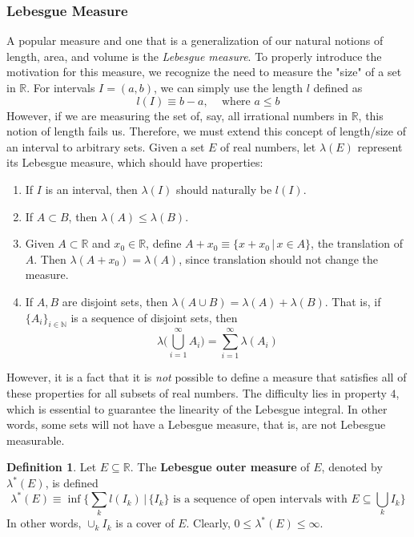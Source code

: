 \documentclass{article}
\theoremstyle{remark}
\theoremstyle{definition}
\newtheorem{definition}{Definition}[section]
\begin{document}
\subsubsection{Lebesgue Measure}
A popular measure and one that is a generalization of our natural notions of length, area, and volume is the \textit{Lebesgue measure}. To properly introduce the motivation for this measure, we recognize the need to measure the "size" of a set in $\mathbb{R}$. For intervals $I = (a, b)$, we can simply use the length $l$ defined as 
\[l(I) \equiv b - a, \;\;\; \text{ where } a \leq b\]
However, if we are measuring the set of, say, all irrational numbers in $\mathbb{R}$, this notion of length fails us. Therefore, we must extend this concept of length/size of an interval to arbitrary sets. Given a set $E$ of real numbers, let $\lambda(E)$ represent its Lebesgue measure, which should have properties: 
\begin{enumerate}
    \item If $I$ is an interval, then $\lambda(I)$ should naturally be $l(I)$. 
    \item If $A \subset B$, then $\lambda (A) \leq \lambda(B)$. 
    \item Given $A \subset \mathbb{R}$ and $x_0 \in \mathbb{R}$, define $A + x_0 \equiv \{x + x_0\,|\, x \in A\}$, the translation of $A$. Then $\lambda (A + x_0) = \lambda (A)$, since translation should not change the measure. 
    \item If $A, B$ are disjoint sets, then $\lambda(A \cup B) = \lambda(A) + \lambda(B)$. That is, if $\{A_i\}_{i \in \mathbb{N}}$ is a sequence of disjoint sets, then 
    \[\lambda \bigg( \bigcup_{i=1}^\infty A_i\bigg) = \sum_{i=1}^\infty \lambda(A_i)\]
\end{enumerate}
However, it is a fact that it is \textit{not} possible to define a measure that satisfies all of these properties for all subsets of real numbers. The difficulty lies in property $4$, which is essential to guarantee the linearity of the Lebesgue integral. In other words, some sets will not have a Lebesgue measure, that is, are not Lebesgue measurable. 

\begin{definition}
Let $E \subseteq \mathbb{R}$. The \textbf{Lebesgue outer measure} of $E$, denoted by $\lambda^* (E)$, is defined
\[\lambda^*(E) \equiv \inf \bigg\{ \sum_k l(I_k)\,|\,\{I_k\} \text{ is a sequence of open intervals with } E \subseteq \bigcup_k I_k \bigg\}\]
In other words, $\cup_{k} I_k$ is a cover of $E$. Clearly, $0 \leq \lambda^* (E) \leq \infty$.
\end{definition}
\end{document}
